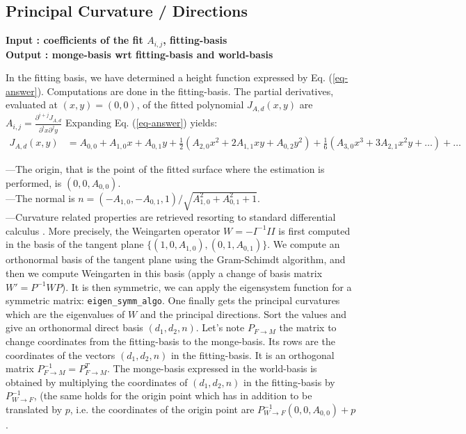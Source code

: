 \subsection{Principal  Curvature / Directions}

{\bf Input : coefficients of the fit $A_{i,j}$, 
fitting-basis \\
Output : monge-basis wrt fitting-basis and world-basis
}

In the fitting basis, we have determined a height function expressed
by Eq. (\ref{eq-answer}). Computations are done in the fitting-basis.
The partial derivatives, evaluated at $(x,y)=(0,0)$, of the fitted
polynomial $J_{A,d}(x,y)$ are
$A_{i,j}=\frac{\partial^{i+j}J_{A,d}}{\partial^ix \partial^jy}$
Expanding Eq. (\ref{eq-answer}) yields:
\begin{eqnarray}
J_{A,d}(x,y)&=
A_{0,0}+A_{1,0}x+A_{0,1}y+\frac{1}{2}(A_{2,0}x^2+2A_{1,1}xy+A_{0,2}y^2) 
+ \frac{1}{6}(A_{3,0}x^3+3A_{2,1}x^2y+\ldots )+ \ldots 
\end{eqnarray}


---The origin, that is the point of the fitted surface where the
estimation is performed, is $(0,0,A_{0,0})$. \\
---The normal is
$n=(-A_{1,0},-A_{0,1},1)/\sqrt{A_{1,0}^2+A_{0,1}^2+1}$.\\
---Curvature related properties are retrieved resorting to standard
differential calculus \cite{c-dgcs-76}. More precisely, the Weingarten
operator $W=-I^{-1}II$ is first computed in the basis of the tangent
plane $\{ (1,0,A_{1,0}), (0,1,A_{0,1}) \}$. We compute an orthonormal
basis of the tangent plane using the Gram-Schimdt algorithm, and then
we compute Weingarten in this basis (apply a change of basis matrix
$W'=P^{-1}WP$). It is then symmetric, we can apply the eigensystem
function for a symmetric matrix:
\verb+eigen_symm_algo+.
One finally gets the principal curvatures which are the eigenvalues of
$W$ and the principal directions. Sort the values and give an
orthonormal direct basis $(d_1,d_2,n)$. Let's note $P_{F
\rightarrow M}$ the matrix to change coordinates from the
fitting-basis to the monge-basis. Its rows are the coordinates of the
vectors $(d_1,d_2,n)$ in the fitting-basis. It is an orthogonal matrix
$P_{F \rightarrow M}^{-1}=P_{F \rightarrow M}^T$. The monge-basis
expressed in the world-basis is obtained by multiplying the coordinates
of $(d_1,d_2,n)$ in the fitting-basis by $P_{W\rightarrow F}^{-1}$,
(the same holds for the origin point which has in addition to be
translated by $p$, i.e. the coordinates of the origin point are
$P_{W\rightarrow F}^{-1} (0,0,A_{0,0}) +p$.

